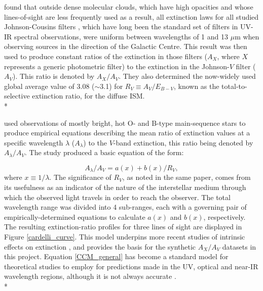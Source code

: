 \documentclass[12pt, a4paper]{report}
\begin{document}
\cite{1985ApJ...288..618R} found that outside dense molecular clouds, which have high opacities and whose lines-of-sight are less frequently used as a result, all extinction laws for all studied Johnson-Cousins filters \citep{1953ApJ...117..313J}, which have long been the standard set of filters in UV-IR spectral observations, were uniform between wavelengths of 1 and 13 $\mu$m when observing sources in the direction of the Galactic Centre. This result was then used to produce constant ratios of the extinction in those filters ($A_{X}$, where $X$ represents a generic photometric filter) to the extinction in the Johnson-$V$ filter ($A_{V}$). This ratio is denoted by $A_{X}/A_{V}$. They also determined the now-widely used global average value of 3.08 ($\sim$3.1) for $R_{V} \equiv A_{V}/E_{B-V}$, known as the total-to-selective extinction ratio,  for the diffuse ISM. \\*

\cite{1989ApJ...345..245C} used observations of mostly bright, hot O- and B-type main-sequence stars to produce empirical equations describing the mean ratio of extinction values at a specific wavelength $\lambda$ ($A_{\lambda}$) to the $V$-band extinction, this ratio being denoted by $A_{\lambda}/A_{V}$. The study produced a basic equation of the form:

\begin{equation}
A_{\lambda}/A_{V} = a(x) + b(x)/R_{V},
\label{CCM_general}
\end{equation}
where $x \equiv 1/\lambda$. The significance of $R_{V}$, as noted in the same paper, comes from its usefulness as an indicator of the nature of the interstellar medium through which the observed light travels in order to reach the observer. The total wavelength range was divided into 4 sub-ranges, each with a governing pair of empirically-determined equations to calculate $a(x)$ and $b(x)$, respectively. The resulting extinction-ratio profiles for three lines of sight are displayed in Figure \ref{cardelli_curve}. This model underpins more recent studies of intrinsic effects on extinction \citep{2008PASP..120..583G,2014MNRAS.444..392C,2018MNRAS.475.5023C,2018MNRAS.479L.102C}, and provides the basis for the synthetic $A_{X}/A_{V}$ datasets in this project. Equation \ref{CCM_general} has become a standard model for theoretical studies to employ for predictions made in the UV, optical and near-IR wavelength regions, although it is not always accurate \citep{1994ApJ...422..158O,1999PASP..111...63F}. \\*
\end{document}
